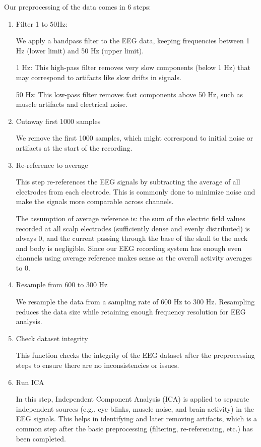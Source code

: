 \documentclass[12pt,a4paper,titlepage,openany]{report}
\begin{document}
Our preprocessing of the data comes in 6 steps:

\begin{enumerate}
    \item Filter 1 to 50Hz:
    
    We apply a bandpass filter to the EEG data, keeping frequencies between 1 Hz (lower limit) and 50 Hz (upper limit).

    1 Hz: This high-pass filter removes very slow components (below 1 Hz) that may correspond to artifacts like slow drifts in signals.

    50 Hz: This low-pass filter removes fast components above 50 Hz, such as muscle artifacts and electrical noise.

    \item Cutaway first 1000 samples

    We remove the first 1000 samples, which might correspond to initial noise or artifacts at the start of the recording. 

    \item Re-reference to average

    This step re-references the EEG signals by subtracting the average of all electrodes from each electrode. This is commonly done to minimize noise and make the signals more comparable across channels.

    The assumption of average reference is: the sum of the electric field values recorded at all scalp electrodes (sufficiently dense and evenly distributed) is always 0, and the current passing through the base of the skull to the neck and body is negligible. 
    Since our EEG recording system has enough even channels using average reference makes sense as the overall activity averages to 0.

    \item Resample from 600 to 300 Hz

    We resample the data from a sampling rate of 600 Hz to 300 Hz. Resampling reduces the data size while retaining enough frequency resolution for EEG analysis.

    \item Check dataset integrity

    This function checks the integrity of the EEG dataset after the preprocessing steps to ensure there are no inconsistencies or issues.

    \item Run ICA

    In this step, Independent Component Analysis (ICA) is applied to separate independent sources (e.g., eye blinks, muscle noise, and brain activity) in the EEG signals. This helps in identifying and later removing artifacts, which is a common step after the basic preprocessing (filtering, re-referencing, etc.) has been completed.

\end{enumerate}
\end{document}
